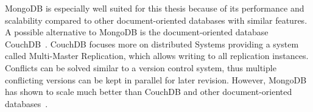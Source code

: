 MongoDB is especially well suited for this thesis because of its
performance and scalability compared to other document-oriented
databases with similar features. A possible alternative to MongoDB is
the document-oriented database CouchDB~\cite{CouchDB}. CouchDB focuses
more on distributed Systems providing a system called Multi-Master
Replication, which allows writing to all replication instances.
Conflicts can be solved similar to a version control system, thus
multiple conflicting versions can be kept in parallel for later
revision. However, MongoDB has shown to scale much better than CouchDB
and other document-oriented databases~\cite{db-comparison}.
